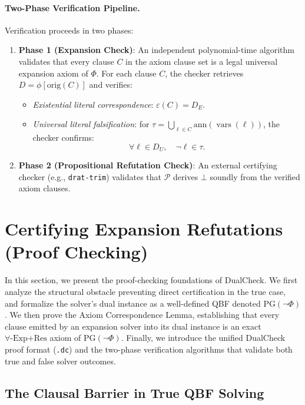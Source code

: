 \documentclass[runningheads]{llncs}
\DeclareMathOperator{\vars}{vars}
\newcommand{\ExpRes}{\forall\text{-}\mathrm{Exp}\text{+}\mathrm{Res}}
\newcommand{\PG}{\mathrm{PG}}
\begin{document}
\paragraph*{Two-Phase Verification Pipeline.}
Verification proceeds in two phases:
\begin{enumerate}
    \item \textbf{Phase 1 (Expansion Check)}:
          An independent polynomial-time algorithm validates that every clause $C$ in the axiom clause set is a legal universal expansion axiom of $\Phi$.
          For each clause $C$, the checker retrieves $D = \phi[\mathrm{orig}(C)]$ and verifies:
          \begin{itemize}
              \item \emph{Existential literal correspondence}: $\varepsilon(C) = D_E$.
              \item \emph{Universal literal falsification}: for $\tau = \bigcup_{\ell \in C} \mathrm{ann}(\vars(\ell))$, the checker confirms:
                    \begin{equation}
                        \forall \ell \in D_U, \quad \neg\ell \in \tau .
                    \end{equation}
          \end{itemize}
    \item \textbf{Phase 2 (Propositional Refutation Check)}:
          An external certifying checker (e.g., \texttt{drat-trim}) validates that $\mathcal{P}$ derives $\bot$ soundly from the verified axiom clauses.
\end{enumerate}

\section{Certifying Expansion Refutations (Proof Checking)}
\label{sec:checking}

In this section, we present the proof-checking foundations of DualCheck.
We first analyze the structural obstacle preventing direct certification in the true case, and formalize the solver's dual instance as a well-defined QBF denoted $\PG(\neg\Phi)$.
We then prove the Axiom Correspondence Lemma, establishing that every clause emitted by an expansion solver into its dual instance is an exact $\ExpRes$ axiom of $\PG(\neg\Phi)$.
Finally, we introduce the unified DualCheck proof format (\texttt{.dc}) and the two-phase verification algorithms that validate both true and false solver outcomes.

\subsection{The Clausal Barrier in True QBF Solving}
\label{subsec:barrier}
\end{document}
